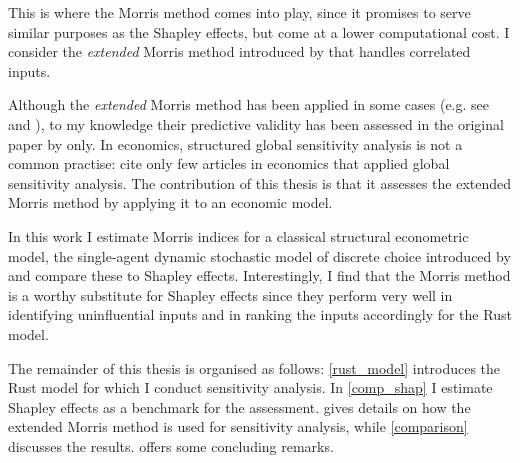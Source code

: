 
This is where the Morris method comes into play, since it promises to serve similar purposes as the Shapley effects, but come at a lower computational cost. I consider the \textit{extended} Morris method introduced by \citet{GM17} that handles correlated inputs.


Although the \textit{extended} Morris method has been applied in some cases (e.g. see \citet{MMA18} and \citet{RZY19}), to my knowledge their predictive validity has been assessed in the original paper by \citet{GM17} only. In economics, structured global sensitivity analysis is not a common practise: \citet{HMSW19} cite only few articles in economics that applied global sensitivity analysis. The contribution of this thesis is that it assesses the extended Morris method by applying it to an economic model.

In this work I estimate Morris indices for a classical structural econometric model, the single-agent dynamic stochastic model of discrete choice introduced by \citet{R87} and compare these to Shapley effects. Interestingly, I find that the Morris method is a worthy substitute for Shapley effects since they perform very well in identifying uninfluential inputs and in ranking the inputs accordingly for the Rust model.



The remainder of this thesis is organised as follows: \cref{rust_model} introduces the Rust model for which I conduct sensitivity analysis. In \cref{comp_shap} I estimate Shapley effects as a benchmark for the assessment.  gives details on how the extended Morris method is used for sensitivity analysis, while \cref{comparison} discusses the results.  offers some concluding remarks.